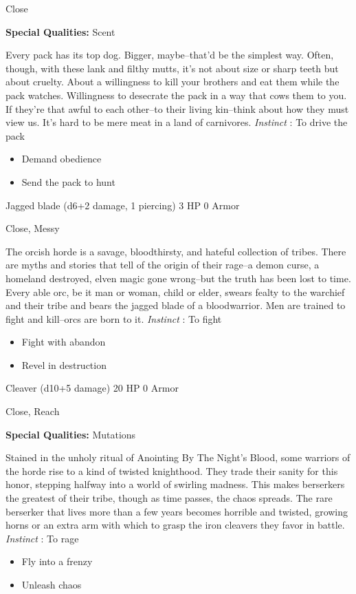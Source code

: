  Close


 \textbf{Special Qualities:}
 Scent


 Every pack has its top dog. Bigger, maybe--that'd be the simplest way. Often, though, with these lank and filthy mutts, it's not about size or sharp teeth but about cruelty. About a willingness to kill your brothers and eat them while the pack watches. Willingness to desecrate the pack in a way that cows them to you. If they're that awful to each other--to their living kin--think about how they must view us. It's hard to be mere meat in a land of carnivores. \emph{Instinct}
: To drive the pack
\begin{itemize}
\item Demand obedience
\item Send the pack to hunt

\end{itemize}




 Jagged blade (d6+2 damage, 1 piercing) 3 HP 0 Armor


 Close, Messy


 The orcish horde is a savage, bloodthirsty, and hateful collection of tribes. There are myths and stories that tell of the origin of their rage--a demon curse, a homeland destroyed, elven magic gone wrong--but the truth has been lost to time. Every able orc, be it man or woman, child or elder, swears fealty to the warchief and their tribe and bears the jagged blade of a bloodwarrior. Men are trained to fight and kill--orcs are born to it. \emph{Instinct}
: To fight
\begin{itemize}
\item Fight with abandon
\item Revel in destruction

\end{itemize}




 Cleaver (d10+5 damage) 20 HP 0 Armor


 Close, Reach


 \textbf{Special Qualities:}
 Mutations


 Stained in the unholy ritual of Anointing By The Night's Blood, some warriors of the horde rise to a kind of twisted knighthood. They trade their sanity for this honor, stepping halfway into a world of swirling madness. This makes berserkers the greatest of their tribe, though as time passes, the chaos spreads. The rare berserker that lives more than a few years becomes horrible and twisted, growing horns or an extra arm with which to grasp the iron cleavers they favor in battle. \emph{Instinct}
: To rage
\begin{itemize}
\item Fly into a frenzy
\item Unleash chaos

\end{itemize}


